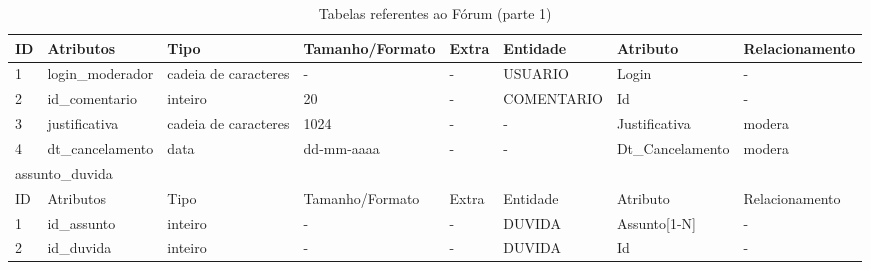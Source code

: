 \documentclass[graduacao,brazil]{ThesisPUC}
\begin{document}
\begin{table}[H]
{\begin{tabular}{|l|l|l|l|l|l|l|l|}
    ID                        & Atributos        & Tipo                 & Tamanho/Formato & Extra            & Entidade        & Atributo         & Relacionamento  \\ \hline
    1                         & login\_moderador & cadeia de caracteres & -               & -                & USUARIO         & Login            & -               \\ \hline
    2                         & id\_comentario   & inteiro              & 20              & -                & COMENTARIO      & Id               & -               \\ \hline
    3                         & justificativa    & cadeia de caracteres & 1024            & -                & -               & Justificativa    & modera          \\ \hline
    4                         & dt\_cancelamento & data                 & dd-mm-aaaa      & -                & -               & Dt\_Cancelamento & modera          \\ \hline
    \multicolumn{8}{|l|}{assunto\_duvida} \\ \hline
    ID                        & Atributos        & Tipo                 & Tamanho/Formato & Extra            & Entidade        & Atributo         & Relacionamento  \\ \hline
    1                         & id\_assunto      & inteiro              & -               & -                & DUVIDA          & Assunto[1-N]     & -               \\ \hline
    2                         & id\_duvida       & inteiro              & -               & -                & DUVIDA          & Id               & -               \\ \hline
    \end{tabular}
    }
    \caption {Tabelas referentes ao F\'{o}rum (parte 1)}
\end{table}

\end{document}

